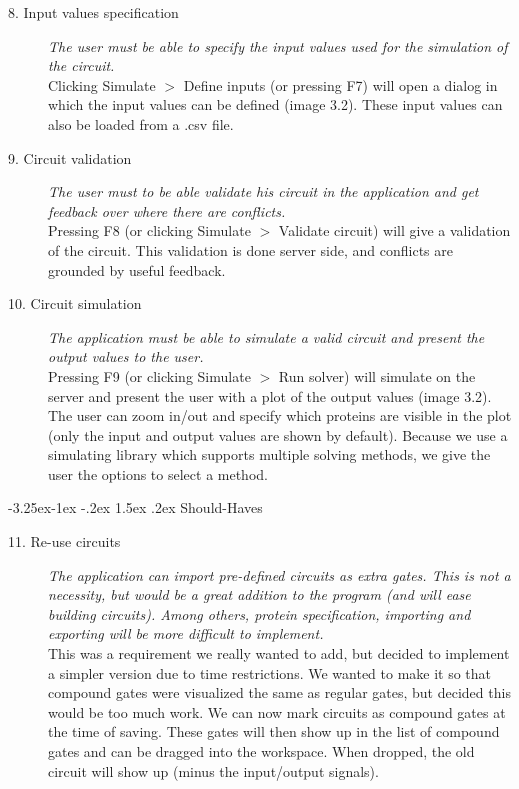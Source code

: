 \documentclass[a4paper]{article}
\makeatletter
\renewcommand\paragraph{\@startsection{paragraph}{4}{\z@}%
  {-3.25ex\@plus -1ex \@minus -.2ex}%
  {1.5ex \@plus .2ex}%
  {\normalfont\normalsize\bfseries}}
\makeatother
\begin{document}
\begin{description}
\item[8. Input values specification] \textit{The user must be able to specify the input values used for the simulation of the circuit.}\\
Clicking Simulate $>$ Define inputs (or pressing F7) will open a dialog in which the input values can be defined (image 3.2). These input values can also be loaded from a .csv file.

\item[9. Circuit validation] \textit{The user must to be able validate his circuit in the application and get feedback over where there are conflicts.}\\
Pressing F8 (or clicking Simulate $>$ Validate circuit) will give a validation of the circuit. This validation is done server side, and conflicts are grounded by useful feedback.

\item[10. Circuit simulation] \textit{The application must be able to simulate a valid circuit and present the output values to the user.}\\
Pressing F9 (or clicking Simulate $>$ Run solver) will simulate on the server and present the user with a plot of the output values (image 3.2). The user can zoom in/out and specify which proteins are visible in the plot (only the input and output values are shown by default). Because we use a simulating library which supports multiple solving methods, we give the user the options to select a method.
\end{description}

\paragraph{Should-Haves}
\begin{description}
\item[11. Re-use circuits] \textit{The application can import pre-defined circuits as extra gates. This is not a necessity, but would be a great addition to the program (and will ease building circuits). Among others, protein specification, importing and exporting will be more difficult to implement.}\\
This was a requirement we really wanted to add, but decided to implement a simpler version due to time restrictions. We wanted to make it so that compound gates were visualized the same as regular gates, but decided this would be too much work. We can now mark circuits as compound gates at the time of saving. These gates will then show up in the list of compound gates and can be dragged into the workspace. When dropped, the old circuit will show up (minus the input/output signals).
\end{description}
\end{document}
